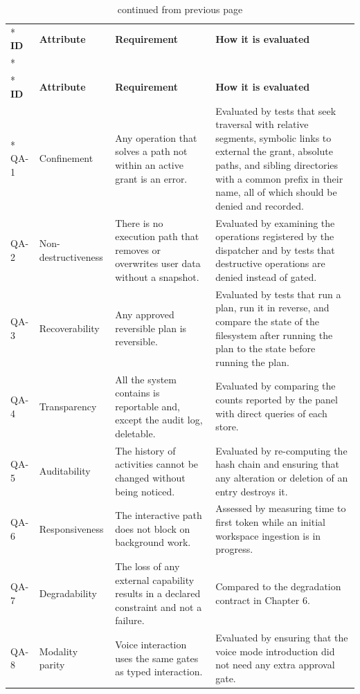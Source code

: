 \documentclass{FastFyp}
\begin{document}
{\small
{}
\begin{longtable}{|p{1.1cm}|p{2.5cm}|p{5.0cm}|p{5.0cm}|}
\caption{Quality attributes.}\label{tab:qa}\\*
\hline
\textbf{ID} & \textbf{Attribute} & \textbf{Requirement} & \textbf{How it is evaluated} \\*
\hline
\endfirsthead
\caption[]{continued from previous page}\\*
\hline
\textbf{ID} & \textbf{Attribute} & \textbf{Requirement} & \textbf{How it is evaluated} \\*
\hline
\endhead
QA-1 & Confinement & Any operation that solves a path not within an active grant is an error. & Evaluated by tests that seek traversal with relative segments, symbolic links to external the grant, absolute paths, and sibling directories with a common prefix in their name, all of which should be denied and recorded. \\
\hline
QA-2 & Non-destructiveness & There is no execution path that removes or overwrites user data without a snapshot. & Evaluated by examining the operations registered by the dispatcher and by tests that destructive operations are denied instead of gated. \\
\hline
QA-3 & Recoverability & Any approved reversible plan is reversible. & Evaluated by tests that run a plan, run it in reverse, and compare the state of the filesystem after running the plan to the state before running the plan. \\
\hline
QA-4 & Transparency & All the system contains is reportable and, except the audit log, deletable. & Evaluated by comparing the counts reported by the panel with direct queries of each store. \\
\hline
QA-5 & Auditability & The history of activities cannot be changed without being noticed. & Evaluated by re-computing the hash chain and ensuring that any alteration or deletion of an entry destroys it. \\
\hline
QA-6 & Responsiveness & The interactive path does not block on background work. & Assessed by measuring time to first token while an initial workspace ingestion is in progress. \\
\hline
QA-7 & Degradability & The loss of any external capability results in a declared constraint and not a failure. & Compared to the degradation contract in Chapter 6. \\
\hline
QA-8 & Modality parity & Voice interaction uses the same gates as typed interaction. & Evaluated by ensuring that the voice mode introduction did not need any extra approval gate. \\
\hline
\end{longtable}
}
\end{document}
